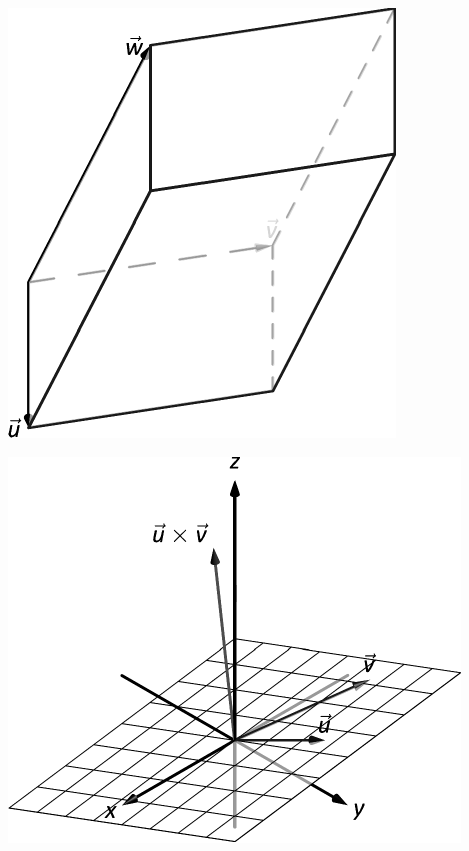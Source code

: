 \documentclass[10pt]{article}
\begin{document}
\includegraphics{figcrosspparallelpiped_3DBW.pdf}
\texttt{}

\includegraphics{figcrossp_rhr_3DBW.pdf}
\texttt{}
\end{document}
